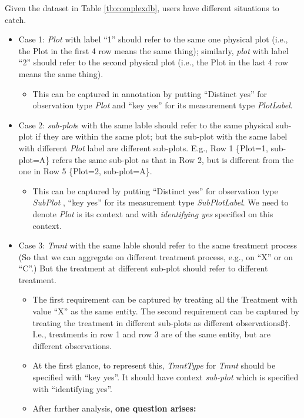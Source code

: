 \documentclass[10pt]{article}
\begin{document}
\noindent  Given the dataset in Table \ref{tb:complexdb}, users have different situations to catch. 
\begin{itemize}
\item Case 1: {\em Plot} with label ``1'' should refer to the same one physical plot (i.e., the Plot in the first 4 row means the same thing); similarly, 
  {\em plot} with label ``2'' should refer to the second physical plot (i.e., the Plot in the last 4 row means the same thing). 
\begin{itemize} 
\item This can be captured in annotation by putting ``Distinct yes'' for observation type {\em Plot} and ``key yes'' for its measurement type {\em PlotLabel}. 
\end{itemize}
\item Case 2: {\em sub-plot}s with the same lable should refer to the same physical sub-plot if they are within the same plot; 
but the sub-plot with the same label with different {\em Plot} label are different sub-plots.
E.g., Row 1 \{Plot=1, sub-plot=A\} refers the same sub-plot as that in Row 2, but is different from the one in Row 5 \{Plot=2, sub-plot=A\}. 
 \begin{itemize} 
\item This can be captured by putting ``Distinct yes'' for observation type {\em SubPlot} , ``key yes'' for its measurement type {\em SubPlotLabel}. We need to denote {\em Plot} is its context and with {\em identifying yes} specified on this context. 
\end{itemize}
\item Case 3: {\em Tmnt} with the same lable should refer to the same treatment process (So that we can aggregate on different treatment process, e.g., on ``X'' or on ``C''.)  But the treatment at different sub-plot should refer to different treatment. 
 \begin{itemize} 
\item The first requirement can be captured by treating all the Treatment with value ``X'' as the same entity. 
The second requirement can be captured by treating the treatment in different sub-plots as different observationsß†. 
I.e., treatments in row 1 and row 3 are of the same entity, but are different observations. 
\item At the first glance, to represent this, {\em TmntType} for {\em Tmnt} should be specified with ``key yes''. 
It should have context {\em sub-plot} which is specified with ``identifying yes''. 
\item After further analysis, {\bf  one question arises: 
}
\end{itemize}
\end{itemize}
\end{document}

